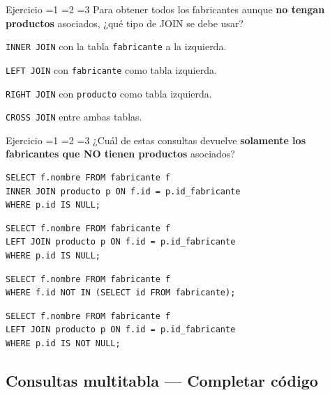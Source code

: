 \documentclass[12pt, a4paper]{article}
\newcommand{\estrella}{{\color{Goldenrod}\faStarSolid}}
\newcommand{\estrellavacia}{{\color{gray!45}\faStarSolid}}
\newcommand{\nivel}[1]{%
  \ifnum#1=1\estrella\estrellavacia\estrellavacia\fi
  \ifnum#1=2\estrella\estrella\estrellavacia\fi
  \ifnum#1=3\estrella\estrella\estrella\fi
}
\newcounter{numej}
\newcommand{\ej}{\stepcounter{numej}\thenumej}
\begin{document}
\begin{ejercicio}{Ejercicio \ej}{\nivel{2}}
Para obtener todos los fabricantes aunque \textbf{no tengan productos}
asociados, ¿qué tipo de JOIN se debe usar?

\begin{opciones}
  \item \texttt{INNER JOIN} con la tabla \texttt{fabricante} a la izquierda.
  \item \texttt{LEFT JOIN} con \texttt{fabricante} como tabla izquierda.
  \item \texttt{RIGHT JOIN} con \texttt{producto} como tabla izquierda.
  \item \texttt{CROSS JOIN} entre ambas tablas.
\end{opciones}
\end{ejercicio}

\begin{ejercicio}{Ejercicio \ej}{\nivel{3}}
¿Cuál de estas consultas devuelve \textbf{solamente los fabricantes
que NO tienen productos} asociados?

\begin{opciones}
  \item
\begin{lstlisting}
SELECT f.nombre FROM fabricante f
INNER JOIN producto p ON f.id = p.id_fabricante
WHERE p.id IS NULL;
\end{lstlisting}
  \item
\begin{lstlisting}
SELECT f.nombre FROM fabricante f
LEFT JOIN producto p ON f.id = p.id_fabricante
WHERE p.id IS NULL;
\end{lstlisting}
  \item
\begin{lstlisting}
SELECT f.nombre FROM fabricante f
WHERE f.id NOT IN (SELECT id FROM fabricante);
\end{lstlisting}
  \item
\begin{lstlisting}
SELECT f.nombre FROM fabricante f
LEFT JOIN producto p ON f.id = p.id_fabricante
WHERE p.id IS NOT NULL;
\end{lstlisting}
\end{opciones}
\end{ejercicio}

\subsection{Consultas multitabla — Completar código}
\end{document}
